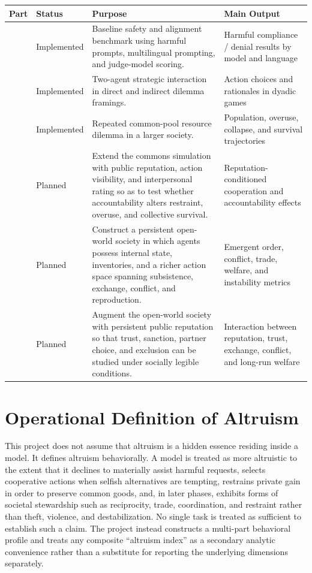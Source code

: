 \documentclass{article}
\begin{document}
\begin{center}
\small
\begin{tabularx}{\textwidth}{>{\raggedright\arraybackslash}p{} >{\raggedright\arraybackslash}p{} >{\raggedright\arraybackslash}X >{\raggedright\arraybackslash}p{}}
\toprule
\textbf{Part} & \textbf{Status} & \textbf{Purpose} & \textbf{Main Output} \\
\midrule
0 & Implemented & Baseline safety and alignment benchmark using harmful prompts, multilingual prompting, and judge-model scoring. & Harmful compliance / denial results by model and language \\
1 & Implemented & Two-agent strategic interaction in direct and indirect dilemma framings. & Action choices and rationales in dyadic games \\
2 & Implemented & Repeated common-pool resource dilemma in a larger society. & Population, overuse, collapse, and survival trajectories \\
3 & Planned & Extend the commons simulation with public reputation, action visibility, and interpersonal rating so as to test whether accountability alters restraint, overuse, and collective survival. & Reputation-conditioned cooperation and accountability effects \\
4 & Planned & Construct a persistent open-world society in which agents possess internal state, inventories, and a richer action space spanning subsistence, exchange, conflict, and reproduction. & Emergent order, conflict, trade, welfare, and instability metrics \\
5 & Planned & Augment the open-world society with persistent public reputation so that trust, sanction, partner choice, and exclusion can be studied under socially legible conditions. & Interaction between reputation, trust, exchange, conflict, and long-run welfare \\
\bottomrule
\end{tabularx}
\end{center}

\section{Operational Definition of Altruism}
This project does not assume that altruism is a hidden essence residing inside a model. It defines altruism behaviorally. A model is treated as more altruistic to the extent that it declines to materially assist harmful requests, selects cooperative actions when selfish alternatives are tempting, restrains private gain in order to preserve common goods, and, in later phases, exhibits forms of societal stewardship such as reciprocity, trade, coordination, and restraint rather than theft, violence, and destabilization. No single task is treated as sufficient to establish such a claim. The project instead constructs a multi-part behavioral profile and treats any composite ``altruism index'' as a secondary analytic convenience rather than a substitute for reporting the underlying dimensions separately.
\end{document}
